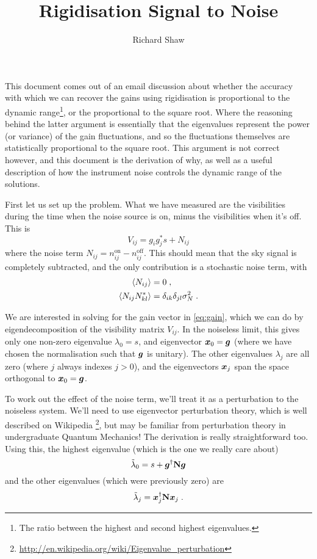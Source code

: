 \documentclass[oldfontcommands,letter,11pt,oneside,article]{memoir}
\begin{document}
\title{Rigidisation Signal to Noise}
\author{Richard Shaw}

\maketitle

This document comes out of an email discussion about whether the accuracy with
which we can recover the gains using rigidisation is proportional to the
dynamic range\footnote{The ratio between the highest and second highest
eigenvalues.}, or the proportional to the square root. Where the reasoning
behind the latter argument is essentially that the eigenvalues represent the
power (or variance) of the gain fluctuations, and so the fluctuations
themselves are statistically proportional to the square root. This argument is
not correct however, and this document is the derivation of why, as well as a
useful description of how the instrument noise controls the dynamic range of
the solutions.

First let us set up the problem. What we have measured are the visibilities
during the time when the noise source is on, minus the visibilities when it's
off. This is
\begin{equation}
\label{eq:gain}
V_{ij} = g_i g_j^* s + N_{ij}
\end{equation}
where the noise term $N_{ij} = n_{ij}^\text{on} - n_{ij}^\text{off}$.
This should mean that the sky signal is completely subtracted, and the only
contribution is a stochastic noise term, with
\begin{subequations}
\begin{align}
\label{eq:noise_stats}
\left\langle N_{ij} \right\rangle & = 0 \; , \\
\left\langle N_{ij} N_{kl}^* \right\rangle & = \delta_{ik} \delta_{jl} \sigma_N^2 \; .
\end{align}
\end{subequations}

We are interested in solving for the gain vector in \eqref{eq:gain}, which we
can do by eigendecomposition of the visibility matrix $V_{ij}$. In the
noiseless limit, this gives only one non-zero eigenvalue $\lambda_0 = s$, and
eigenvector $\boldsymbol{x}_0 = \boldsymbol{g}$ (where we have chosen the normalisation such that
$\boldsymbol{g}$ is unitary). The other eigenvalues $\lambda_j$ are all zero (where $j$
always indexes $j > 0$), and the eigenvectors $\boldsymbol{x}_j$ span the space orthogonal
to $\boldsymbol{x}_0 = \boldsymbol{g}$.

To work out the effect of the noise term, we'll treat it as a perturbation to the noiseless system. We'll need to use eigenvector perturbation theory, which is well described on Wikipedia \footnote{\url{http://en.wikipedia.org/wiki/Eigenvalue_perturbation}}, but may be familiar from perturbation theory in undergraduate Quantum Mechanics! The derivation is really straightforward too. Using this, the highest eigenvalue (which is the one we really care about)
\begin{equation}
\tilde{\lambda}_0 = s + \boldsymbol{g}^{\dagger} \boldsymbol{\mathbf{N}} \boldsymbol{g}
\end{equation}
and the other eigenvalues (which were previously zero) are
\begin{equation}
\tilde{\lambda}_j = \boldsymbol{x}_j^{\dagger} \boldsymbol{\mathbf{N}} \boldsymbol{x}_j \; .
\end{equation}
\end{document}
